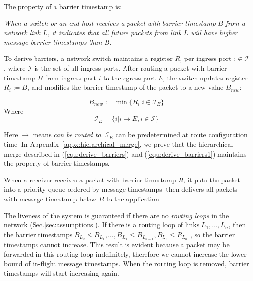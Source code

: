 The property of a barrier timestamp is:

\emph{When a switch or an end host receives a packet with barrier timestamp $B$ from a network link $L$, it indicates that all future packets from link $L$ will have higher message  barrier timestamps than $B$.}

To derive barriers,  a network switch maintains a register $R_i$ per ingress port $i \in \mathcal{I}$, where $\mathcal{I}$ is the set of all ingress ports.
After routing a packet with barrier timestamp $B$ from ingress port $i$ to the egress port $E$, the switch updates register $R_i := B$, and modifies the barrier timestamp of the packet to a new value $B_{new}$:

\begin{equation}\label{equ:derive_barriers}
B_{new}:=\min\{R_i| i\in \mathcal{I}_E\}
\end{equation}
Where 
\begin{equation}\label{equ:derive_barriers1}
\mathcal{I}_E =\{i| i\rightarrow E, i \in \mathcal{I} \}
\end{equation}

Here $\rightarrow$ means \textit{can be routed to}.
$\mathcal{I}_E$ can be predetermined at route configuration time.
In Appendix~\ref{appx:hierarchical_merge}, we prove that the hierarchical merge described in (\ref{equ:derive_barriers}) and (\ref{equ:derive_barriers1}) maintains the property of barrier timestamps.

When a receiver receives a packet with barrier timestamp $B$, it puts the packet into a priority queue ordered by message timestamps, then delivers all packets with message timestamp below $B$ to the application.

{The liveness of the system is guaranteed if there are no \textit{routing loops} in the network (Sec.\ref{sec:assumptions}).}
If there is a routing loop of links $L_1, \ldots , L_n$, then the barrier timestamps $B_{L_2} \leq B_{L_1}, \ldots, B_{L_n} \leq B_{L_{n-1}}, B_{L_1} \leq B_{L_n}$
{, so the barrier timestamps cannot increase.
This result is evident because a packet may be forwarded in this routing loop indefinitely, therefore we cannot increase the lower bound of in-flight message timestamps.}
When the routing loop is removed, barrier timestamps will start increasing again.

